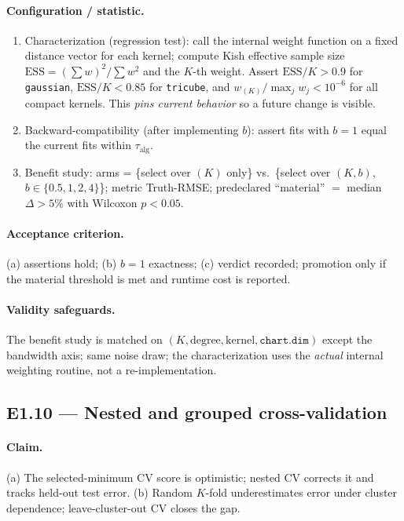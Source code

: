 \documentclass[11pt]{article}
\newcommand{\code}[1]{\texttt{#1}}
\begin{document}
\paragraph{Configuration / statistic.}
\begin{enumerate}[leftmargin=1.4em,nosep]
\item Characterization (regression test): call the internal weight function on a fixed
distance vector for each kernel; compute Kish effective sample size
$\mathrm{ESS}=(\sum w)^2/\sum w^2$ and the $K$-th weight. Assert
$\mathrm{ESS}/K>0.9$ for \code{gaussian}, $\mathrm{ESS}/K<0.85$ for \code{tricube}, and
$w_{(K)}/\max_j w_j<10^{-6}$ for all compact kernels. This \emph{pins current behavior} so a
future change is visible.
\item Backward-compatibility (after implementing $b$): assert fits with $b=1$ equal the
current fits within $\tau_{\mathrm{alg}}$.
\item Benefit study: arms = \{select over $(K)$ only\} vs.\ \{select over $(K,b)$, $b\in\{0.5,1,2,4\}$\};
metric Truth-RMSE; predeclared ``material'' $=$ median $\Delta>5\%$ with Wilcoxon $p<0.05$.
\end{enumerate}

\paragraph{Acceptance criterion.} (a) assertions hold; (b) $b=1$ exactness; (c) verdict
recorded; promotion only if the material threshold is met and runtime cost is reported.

\paragraph{Validity safeguards.} The benefit study is matched on $(K,\text{degree},\text{kernel},
\code{chart.dim})$ except the bandwidth axis; same noise draw; the characterization uses the
\emph{actual} internal weighting routine, not a re-implementation.

\subsection{E1.10 — Nested and grouped cross-validation}

\paragraph{Claim.} (a) The selected-minimum CV score is optimistic; nested CV corrects it and
tracks held-out test error. (b) Random $K$-fold underestimates error under cluster dependence;
leave-cluster-out CV closes the gap.
\end{document}
